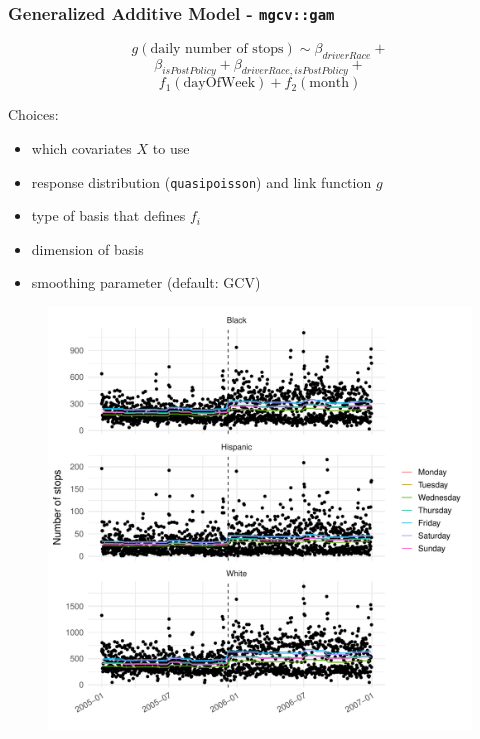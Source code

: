 \documentclass{beamer}
\begin{document}
\begin{frame}
\frametitle{Generalized Additive Model - \texttt{mgcv::gam}}

\begin{multicols}{2}
$$g(\text{daily number of stops}) \sim \beta_{driverRace} + $$
$$\beta_{isPostPolicy}+ \beta_{driverRace, isPostPolicy}+$$
$$ f_1(\text{dayOfWeek}) + f_2(\text{month}) $$

Choices:

\begin{itemize}
\item which covariates $X$ to use
\item response distribution (\texttt{quasipoisson}) and link function $g$
\item type of basis that defines $f_i$
\item dimension of basis
\item smoothing parameter (default: GCV)
\end{itemize}

\columnbreak

\begin{figure}
\includegraphics[scale=.3]{figures/gamResults}
\end{figure}

\end{multicols}


\end{frame}
\end{document}
